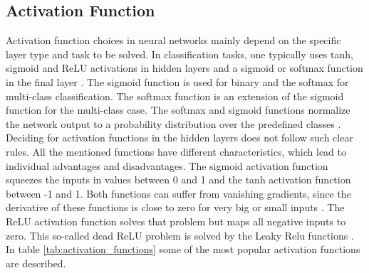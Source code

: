 \subsection{Activation Function}
Activation function choices in neural networks mainly depend on the specific layer type and task to be solved. In classification tasks, one typically uses tanh, sigmoid and ReLU activations in hidden layers and a sigmoid or softmax function in the final layer \cite{ShilohPerl2020}. The sigmoid function is used for binary and the softmax for multi-class classification. The softmax function is an extension of the sigmoid function for the multi-class case. The softmax and sigmoid functions normalize the network output to a probability distribution over the predefined classes \cite{ShilohPerl2020}. Deciding for activation functions in the hidden layers does not follow such clear rules. All the mentioned functions have different characteristics, which lead to individual advantages and disadvantages. The sigmoid activation function squeezes the inputs in values between 0 and 1 and the tanh activation function between -1 and 1. Both functions can suffer from vanishing gradients, since the derivative of these functions is close to zero for very big or small inputs \cite{Calin2020}. The ReLU activation function solves that problem but maps all negative inputs to zero. This so-called dead ReLU problem is solved by the Leaky Relu functions \cite{Dubey2019}. In table \ref{tab:activation_functions} some of the most popular activation functions are described.

